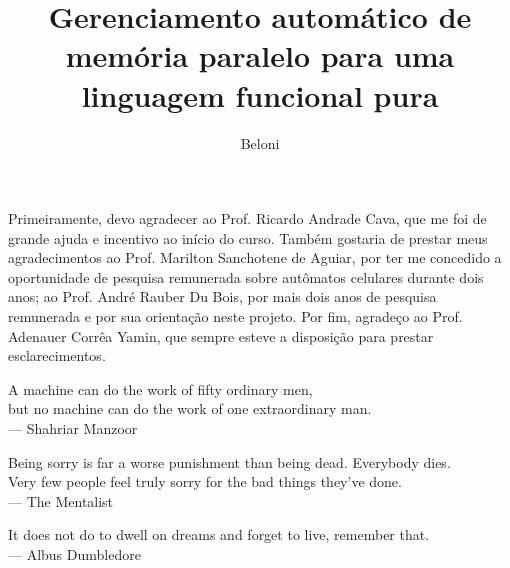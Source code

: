 \documentclass[ccc, pg2]{esinucpel}
\title{Gerenciamento automático de memória paralelo para uma linguagem funcional pura}
\author{Beloni}{Eduardo Fiss}
\begin{document}

\maketitle 
\sloppy


\begin{agradecimentos}
Primeiramente, devo agradecer ao Prof. Ricardo Andrade Cava, que me foi de grande ajuda e incentivo ao início do curso. Também gostaria de prestar meus agradecimentos ao Prof. Marilton Sanchotene de Aguiar, por ter me concedido a oportunidade de pesquisa remunerada sobre autômatos celulares durante dois anos; ao Prof. André Rauber Du Bois, por mais dois anos de pesquisa remunerada e por sua orientação neste projeto. Por fim, agradeço ao Prof. Adenauer Corrêa Yamin, que sempre esteve a disposição para prestar esclarecimentos.
\end{agradecimentos}

\begin{epigrafe}
A machine can do the work of fifty ordinary men,\\
but no machine can do the work of one extraordinary man.\\
{\sc --- Shahriar Manzoor}

\vskip 20pt

Being sorry is far a worse punishment than being dead. Everybody dies.\\
Very few people feel truly sorry for the bad things they've done.\\
{\sc --- The Mentalist}

\vskip 20pt

It does not do to dwell on dreams and forget to live, remember that.\\
{\sc --- Albus Dumbledore}
\end{epigrafe}

\tableofcontents

\listoffigures
\end{document}
